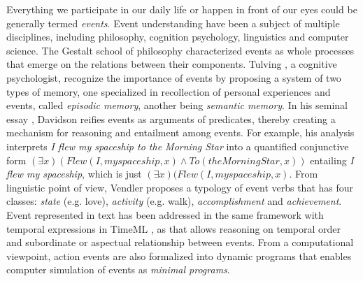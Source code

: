 \documentclass{esann}
\begin{document}
\begin{footnotesize}



\setlength{\bibsep}{1pt plus 0.5ex}




\end{footnotesize}


\iffalse
Everything we participate in our daily life or happen in front of our eyes could be generally termed \textit{events}. Event understanding have been a subject of multiple disciplines, including philosophy, cognition psychology, linguistics and computer science. The Gestalt school of philosophy characterized events as whole processes that emerge on the relations between their components. Tulving \cite{tulving1985elements}, a cognitive psychologist, recognize the importance of events by proposing a system of two types of memory, one specialized in recollection of personal experiences and events, called \textit{episodic memory}, another being \textit{semantic memory}. In his seminal essay , Davidson \cite{davidson1967logical} reifies events as arguments of predicates, thereby creating a mechanism for reasoning and entailment among events. For example, his analysis interprets \textit{I flew my spaceship to the Morning Star} into a quantified conjunctive form  $(\exists x)(Flew(I, my spaceship, x) \land To(the Morning Star, x))$ entailing \textit{I flew my spaceship}, which is just $(\exists x)(Flew(I, my spaceship, x)$. From linguistic point of view, Vendler \cite{vendler1967linguistics} proposes a typology of event verbs that has four classes: \textit{state} (e.g. love), \textit{activity} (e.g. walk), \textit{accomplishment} and \textit{achievement}. Event represented in text has been addressed in the same framework with temporal expressions in TimeML \cite{TimeML:2003}, as that allows reasoning on temporal order and subordinate or aspectual relationship between events. From a computational viewpoint, action events are also formalized into dynamic programs \cite{pustejovsky2013dynamic} that enables computer simulation of events as \textit{minimal programs}. 
\end{document}
